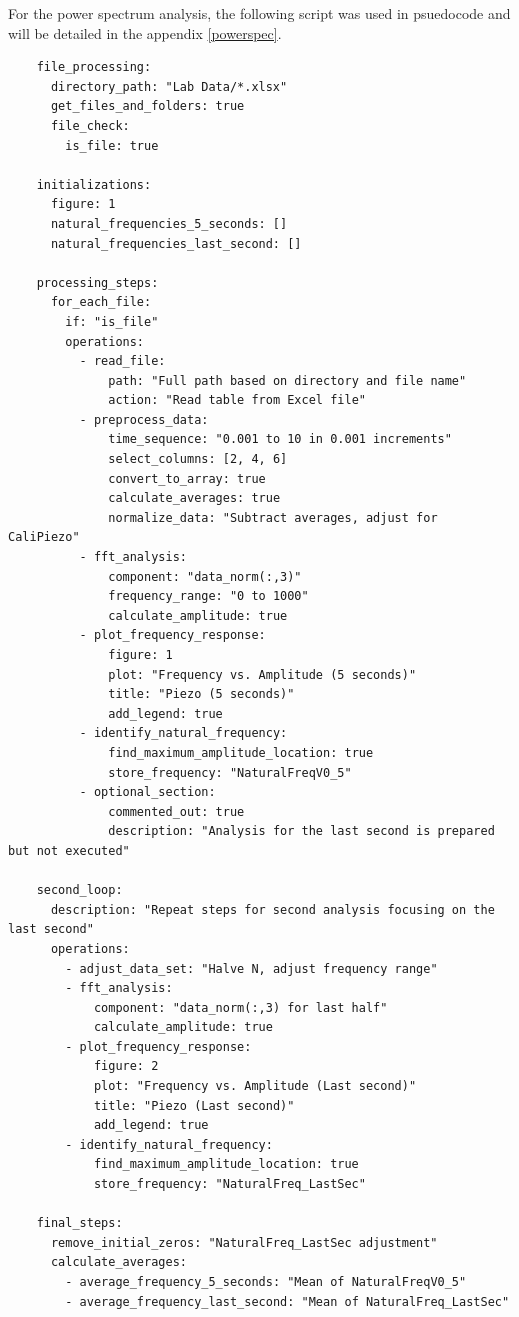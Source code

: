 \documentclass{article}
\begin{document}
For the power spectrum analysis, the following script was used in psuedocode and will be detailed in the appendix \ref{powerspec}.

\begin{verbatim}
    file_processing:
      directory_path: "Lab Data/*.xlsx"
      get_files_and_folders: true
      file_check: 
        is_file: true
    
    initializations:
      figure: 1
      natural_frequencies_5_seconds: []
      natural_frequencies_last_second: []
    
    processing_steps:
      for_each_file:
        if: "is_file"
        operations:
          - read_file:
              path: "Full path based on directory and file name"
              action: "Read table from Excel file"
          - preprocess_data:
              time_sequence: "0.001 to 10 in 0.001 increments"
              select_columns: [2, 4, 6]
              convert_to_array: true
              calculate_averages: true
              normalize_data: "Subtract averages, adjust for CaliPiezo"
          - fft_analysis:
              component: "data_norm(:,3)"
              frequency_range: "0 to 1000"
              calculate_amplitude: true
          - plot_frequency_response:
              figure: 1
              plot: "Frequency vs. Amplitude (5 seconds)"
              title: "Piezo (5 seconds)"
              add_legend: true
          - identify_natural_frequency:
              find_maximum_amplitude_location: true
              store_frequency: "NaturalFreqV0_5"
          - optional_section:
              commented_out: true
              description: "Analysis for the last second is prepared but not executed"
    
    second_loop:
      description: "Repeat steps for second analysis focusing on the last second"
      operations:
        - adjust_data_set: "Halve N, adjust frequency range"
        - fft_analysis:
            component: "data_norm(:,3) for last half"
            calculate_amplitude: true
        - plot_frequency_response:
            figure: 2
            plot: "Frequency vs. Amplitude (Last second)"
            title: "Piezo (Last second)"
            add_legend: true
        - identify_natural_frequency:
            find_maximum_amplitude_location: true
            store_frequency: "NaturalFreq_LastSec"
    
    final_steps:
      remove_initial_zeros: "NaturalFreq_LastSec adjustment"
      calculate_averages:
        - average_frequency_5_seconds: "Mean of NaturalFreqV0_5"
        - average_frequency_last_second: "Mean of NaturalFreq_LastSec"
\end{verbatim}
\end{document}
